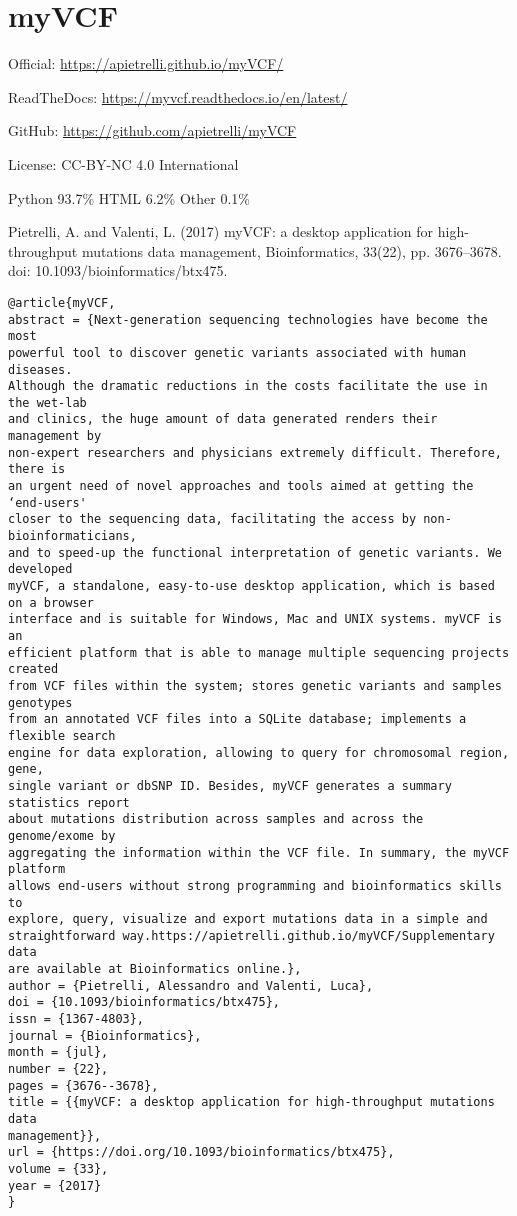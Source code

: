 \documentclass[]{article}
\begin{document}
\section{myVCF}

Official: \url{https://apietrelli.github.io/myVCF/}

ReadTheDocs: \url{https://myvcf.readthedocs.io/en/latest/}

GitHub: \url{https://github.com/apietrelli/myVCF}

License: CC-BY-NC 4.0 International

Python 93.7\% HTML 6.2\% Other 0.1\%

Pietrelli, A. and Valenti, L. (2017) myVCF: a desktop application for high-throughput mutations data management, Bioinformatics, 33(22), pp. 3676–3678. doi: 10.1093/bioinformatics/btx475.

\begin{verbatim}
@article{myVCF,
abstract = {Next-generation sequencing technologies have become the most
powerful tool to discover genetic variants associated with human diseases.
Although the dramatic reductions in the costs facilitate the use in the wet-lab
and clinics, the huge amount of data generated renders their management by
non-expert researchers and physicians extremely difficult. Therefore, there is
an urgent need of novel approaches and tools aimed at getting the ‘end-users'
closer to the sequencing data, facilitating the access by non-bioinformaticians,
and to speed-up the functional interpretation of genetic variants. We developed
myVCF, a standalone, easy-to-use desktop application, which is based on a browser
interface and is suitable for Windows, Mac and UNIX systems. myVCF is an
efficient platform that is able to manage multiple sequencing projects created
from VCF files within the system; stores genetic variants and samples genotypes
from an annotated VCF files into a SQLite database; implements a flexible search
engine for data exploration, allowing to query for chromosomal region, gene,
single variant or dbSNP ID. Besides, myVCF generates a summary statistics report
about mutations distribution across samples and across the genome/exome by
aggregating the information within the VCF file. In summary, the myVCF platform
allows end-users without strong programming and bioinformatics skills to
explore, query, visualize and export mutations data in a simple and
straightforward way.https://apietrelli.github.io/myVCF/Supplementary data
are available at Bioinformatics online.},
author = {Pietrelli, Alessandro and Valenti, Luca},
doi = {10.1093/bioinformatics/btx475},
issn = {1367-4803},
journal = {Bioinformatics},
month = {jul},
number = {22},
pages = {3676--3678},
title = {{myVCF: a desktop application for high-throughput mutations data
management}},
url = {https://doi.org/10.1093/bioinformatics/btx475},
volume = {33},
year = {2017}
}


\end{verbatim}
\end{document}

